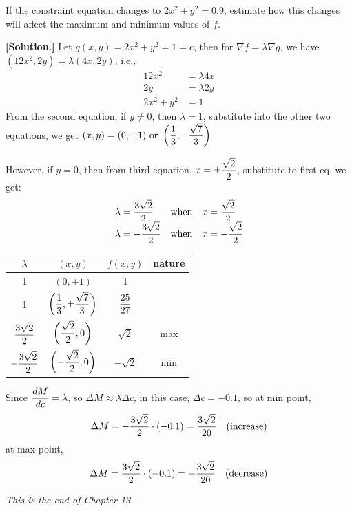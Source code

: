 \documentclass[11pt, a4paper]{MATH2023}
\newcommand{\sol}{\textbf{[Solution.] }}
\begin{document}
\begin{spacing}{1.3}
    If the constraint equation changes to $2 x^{2}+y^{2}=0.9$, 
    estimate how this changes will affect the maximum and minimum values of $f$.

    \sol Let $g(x,y)=2x^2+y^2=1=c$, then for $\nabla f = \lambda \nabla g$, we have
    $(12x^2, 2y)=\lambda (4x, 2y)$, i.e., 
    \begin{align*}
        12x^2 &= \lambda 4x\\
        2y &= \lambda 2y\\
        2x^2+y^2&=1
    \end{align*}
    From the second equation, if $y\ne 0$, then $\lambda = 1$, substitute into the other two equations, 
    we get $\displaystyle (x,y)=(0, \pm 1){\rm \ or\ } \left(\frac{1}{3},\pm \frac{\sqrt{7}}{3}\right)$

    However, if $y=0$, then from third equation, $\displaystyle x=\pm \frac{\sqrt{2}}{2}$, substitute to first eq, 
    we get:
    $$\begin{array}{lll}
        \lambda = \dfrac{3\sqrt{2}}{2} & {\rm when} & x=\dfrac{\sqrt{2}}{2}\\
        \lambda = -\dfrac{3\sqrt{2}}{2} & {\rm when} & x=-\dfrac{\sqrt{2}}{2}
    \end{array}$$

    \begin{center}
        \begin{tabular}{|c|c|c|c|}\hline
            $\lambda$ & $(x,y)$ & $f(x,y)$ & nature \\\hline
            1 & $(0, \pm 1)$ & 1 &  \\\hline
            1 & $\displaystyle \left(\frac{1}{3},\pm \frac{\sqrt{7}}{3}\right)$ & $\displaystyle \frac{25}{27}$ &  \\\hline
            $\displaystyle \frac{3\sqrt{2}}{2}$ & $\displaystyle \left(\frac{\sqrt{2}}{2}, 0\right)$ & $\sqrt{2}$ & max \\\hline
            $\displaystyle -\frac{3\sqrt{2}}{2}$ & $\displaystyle \left(-\frac{\sqrt{2}}{2}, 0\right)$ & $-\sqrt{2}$ & min \\\hline        
        \end{tabular}
    \end{center}
    Since $\displaystyle \frac{dM}{dc}=\lambda$, so $\Delta M\approx \lambda \Delta c$, in this case, $\Delta c=-0.1$, so 
    at min point, 
    $$\Delta M=-\frac{3\sqrt{2}}{2}\cdot (-0.1)=\frac{3\sqrt{2}}{20}\quad {\rm (increase)}$$
    at max point,
    $$\Delta M=\frac{3\sqrt{2}}{2}\cdot (-0.1)=-\frac{3\sqrt{2}}{20}\quad {\rm (decrease)}$$



    \vspace{\fill}
    \begin{center}
        {\it This is the end of Chapter 13.}
    \end{center}
    

\end{spacing}
\end{document}
